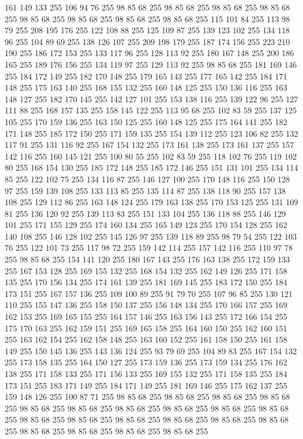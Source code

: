 161 149 133 255 106 94 76 255 98 85 68 255 98 85 68 255 98 85 68 255 98 85 68 255 98 85 68 255 98 85 68 255 98 85 68 255 98 85 68 255 115 101 84 255 113 98 79 255 208 195 176 255 122 108 88 255 125 109 87 255 139 123 102 255 134 118 96 255 104 89 69 255 138 126 107 255 209 198 179 255 187 174 156 255 223 210 190 255 186 172 153 255 133 117 96 255 128 113 92 255 180 167 148 255 200 186 165 255 189 176 156 255 134 119 97 255 129 113 92 255 98 85 68 255 181 169 146 255 184 172 149 255 182 170 148 255 179 165 143 255 177 165 142 255 184 171 148 255 175 163 140 255 168 155 132 255 160 148 125 255 150 136 116 255 163 148 127 255 182 170 145 255 142 127 101 255 153 138 116 255 139 122 96 255 127 111 88 255 168 157 135 255 158 145 122 255 113 95 68 255 102 83 59 255 137 125 105 255 170 159 136 255 163 150 125 255 160 148 125 255 175 164 141 255 182 171 148 255 185 172 150 255 171 159 135 255 154 139 112 255 123 106 82 255 132 117 91 255 131 116 92 255 167 154 132 255
173 161 138 255 173 161 137 255 157 142 116 255 160 145 121 255 100 80 55 255 102 83 59 255 118 102 76 255 119 102 80 255 168 154 130 255 185 172 148 255 185 172 146 255 151 131 101 255 134 114 85 255 122 102 75 255 134 116 87 255 146 127 100 255 170 148 116 255 150 128 97 255 159 139 108 255 133 113 85 255 135 114 87 255 138 118 90 255 157 138 108 255 129 112 86 255 163 148 124 255 179 163 138 255 170 153 125 255 131 109 81 255 136 120 92 255 139 113 83 255 151 133 104 255 136 118 88 255 146 129 101 255 171 155 129 255 174 160 134 255 165 149 123 255 170 154 128 255 162 140 108 255 146 128 102 255 145 126 97 255 139 118 89 255 98 79 54 255 122 103 76 255 122 101 73 255 117 98 72 255 159 142 114 255 157 142 116 255 110 97 78 255 98 85 68 255 154 141 120 255 180 167 143 255 176 163 138 255 172 159 133 255 167 153 128 255 169 155 132 255 168 154 132 255 162 149 126 255 171 158 135 255 170 156 134 255 174 161 139 255 181 169 145 255 183 172 150 255 184 173 151 255 167 157 136 255
109 100 89 255 91 79 70 255 107 96 85 255 130 121 110 255 155 147 136 255 158 150 137 255 156 148 134 255 170 166 157 255 169 162 153 255 169 165 155 255 164 157 146 255 163 156 143 255 172 166 154 255 175 170 163 255 162 159 151 255 169 165 158 255 164 160 150 255 162 160 151 255 163 162 154 255 162 158 148 255 163 160 152 255 161 158 150 255 161 158 149 255 150 145 136 255 143 136 124 255 93 79 69 255 104 89 83 255 167 154 132 255 173 158 135 255 164 150 127 255 173 159 136 255 173 159 134 255 176 162 138 255 171 158 133 255 171 156 133 255 169 155 132 255 171 158 135 255 184 173 151 255 183 171 149 255 184 171 149 255 181 169 146 255 175 162 137 255 159 148 126 255 100 87 71 255 98 85 68 255 98 85 68 255 98 85 68 255 98 85 68 255 98 85 68 255 98 85 68 255 98 85 68 255 98 85 68 255 98 85 68 255 98 85 68 255 98 85 68 255 98 85 68 255 98 85 68 255 98 85 68 255 98 85 68 255 98 85 68 255 98 85 68 255 98 85 68 255 98 85 68 255 98 85 68 255
